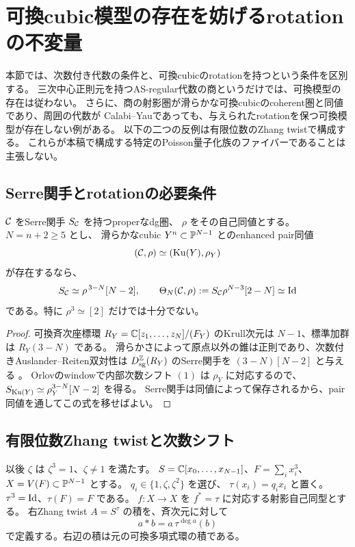 \section{可換cubic模型の存在を妨げるrotationの不変量}
\label{sec:rotation-obstruction}

本節では、次数付き代数の条件と、可換cubicのrotationを持つという条件を区別する。
三次中心正則元を持つAS-regular代数の商というだけでは、可換模型の存在は従わない。
さらに、商の射影圏が滑らかな可換cubicのcoherent圏と同値であり、周囲の代数が
Calabi--Yauであっても、与えられたrotationを保つ可換模型が存在しない例がある。
以下の二つの反例は有限位数のZhang twistで構成する。
これらが本稿で構成する特定のPoisson量子化族のファイバーであることは主張しない。

\subsection{Serre関手とrotationの必要条件}

\begin{proposition}
\label{prop:serre-rotation-obstruction}
 \(\mathcal C\) をSerre関手 \(S_{\mathcal C}\) を持つproperなdg圏、
 \(\rho\) をその自己同値とする。\(N=n+2\ge5\) とし、
 滑らかなcubic \(Y^n\subset\mathbb P^{N-1}\) とのenhanced pair同値
 \[
 (\mathcal C,\rho)\simeq(\operatorname{Ku}(Y),\rho_Y)
 \]
 が存在するなら、
 \begin{equation}\label{eq:serre-rotation-necessary}
 S_{\mathcal C}\simeq\rho^{\,3-N}[N-2],\qquad
 \Theta_N(\mathcal C,\rho):=S_{\mathcal C}\rho^{N-3}[2-N]\simeq\operatorname{Id}
 \end{equation}
 である。特に \(\rho^3\simeq[2]\) だけでは十分でない。
\end{proposition}
\begin{proof}
 可換斉次座標環 \(R_Y=\mathbb C[z_1,\ldots,z_N]/(F_Y)\) のKrull次元は
 \(N-1\)、標準加群は \(R_Y(3-N)\) である。
 滑らかさによって原点以外の錐は正則であり、次数付きAuslander--Reiten双対性は
 \(D_{\mathrm{sg}}^{\mathbb Z}(R_Y)\) のSerre関手を
 \((3-N)[N-2]\) と与える
 \cite[Theorem 7, p.~161]{UeyamaIsolated}。
 Orlovのwindowで内部次数シフト \((1)\) は \(\rho_Y\) に対応するので、
 \(S_{\operatorname{Ku}(Y)}\simeq\rho_Y^{3-N}[N-2]\) を得る。
 Serre関手は同値によって保存されるから、pair同値を通してこの式を移せばよい。
\end{proof}

\subsection{有限位数Zhang twistと次数シフト}

以後 \(\zeta\) は \(\zeta^3=1\)、\(\zeta\ne1\) を満たす。
\(S=\mathbb C[x_0,\ldots,x_{N-1}]\)、\(F=\sum_i x_i^3\)、
\(X=V(F)\subset\mathbb P^{N-1}\) とする。
\(q_i\in\{1,\zeta,\zeta^2\}\) を選び、
\(\tau(x_i)=q_i x_i\) と置く。\(\tau^3=\operatorname{Id}\)、\(\tau(F)=F\) である。
\(f:X\to X\) を \(f^*=\tau\) に対応する射影自己同型とする。
右Zhang twist \(A=S^{\tau}\) の積を、斉次元に対して
\begin{equation}\label{eq:right-zhang-product}
 a*b=a\,\tau^{\deg a}(b)
\end{equation}
で定義する。右辺の積は元の可換多項式環の積である。

